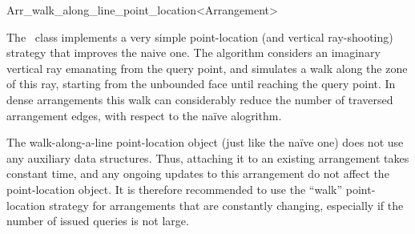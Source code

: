 
\ccRefPageBegin

\begin{ccRefClass}{Arr_walk_along_line_point_location<Arrangement>}
\label{arr_ref:walk_pl}

\ccDefinition

The \ccRefName\ class implements a very simple point-location (and 
vertical ray-shooting) strategy that improves the naive one.
The algorithm considers an imaginary vertical ray emanating from the
query point, and simulates a walk along the zone of this ray, starting
from the unbounded face until reaching the query point.
In dense arrangements this walk can considerably reduce the number
of traversed arrangement edges, with respect to the na\"{i}ve
alogrithm.

The walk-along-a-line point-location object (just like the na\"{i}ve one)
does not use any auxiliary data structures. Thus, attaching it to an
existing arrangement takes constant time, and any ongoing updates to
this arrangement do not affect the point-location object.
It is therefore recommended to use the ``walk'' point-location strategy
for arrangements that are constantly changing, especially if the number
of issued queries is not large.


\ccIsModel
   \\

\end{ccRefClass}

\ccRefPageEnd
